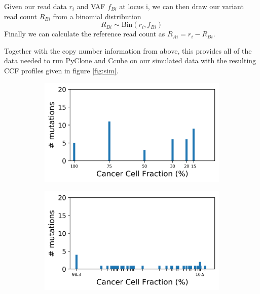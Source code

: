 \documentclass{article}
\begin{document}
Given our read data $r_i$ and VAF $f_{Bi}$ at locus i, we can then draw our variant read count $R_{Bi}$ from a binomial distribution 
\begin{equation}
R_{Bi} \sim \text{Bin}(r_i, f_{Bi})
\end{equation}
Finally we can calculate the reference read count as $R_{Ai} = r_i - R_{Bi}$.

Together with the copy number information from above, this provides all of the data needed to run PyClone and Ccube on our simulated data with the resulting CCF profiles given in figure \ref{fig:sim}. 

\begin{figure}[h]
	\centering
	\begin{subfigure}[t]{0.32\linewidth}
		\centering
		\includegraphics[width = 1.0\linewidth, trim={0 0 0 0}, clip=true]{pyclone_analysis_sim/realcols.png}
		\subcaption{}
	\end{subfigure}%
	\hspace{0.01 \linewidth}
	\begin{subfigure}[t]{0.32\linewidth}
		\centering
		\includegraphics[width = 1.0\linewidth, trim={0 0 0 0}, clip=true]{pyclone_analysis_sim/cols.png}

\end{subfigure}
\end{figure}
\end{document}
